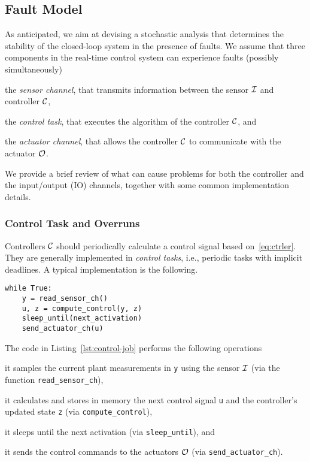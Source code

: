 \subsection{Fault Model}%
\label{sec:impl}%
%
As anticipated, we aim at devising a stochastic analysis that determines the stability of the closed-loop system in the presence of faults.
We assume that three components in the real-time control system can experience faults (possibly simultaneously)
%
\begin{enumerate*}[label=(\roman*)]
    \item the \emph{sensor channel}, that transmits information between the sensor $\mathcal{I}$ and controller $\mathcal{C}$,
    \item the \emph{control task}, that executes the algorithm of the controller $\mathcal{C}$, and 
    \item the \emph{actuator channel}, that allows the controller $\mathcal{C}$ to communicate with the actuator $\mathcal{O}$.
\end{enumerate*}
%
We provide a brief review of what can cause problems for both the controller and the input/output (IO) channels, together with some common implementation details.

\subsubsection*{Control Task and Overruns}
Controllers $\mathcal{C}$ should periodically calculate a control signal based on~\eqref{eq:ctrler}. They are generally implemented in \emph{control tasks}, i.e., periodic tasks with implicit deadlines.
A typical implementation is the following.
\begin{lstlisting}[label=lst:control-job,caption={Typical control algorithm execution.}]
while True:
    y = read_sensor_ch()
    u, z = compute_control(y, z)
    sleep_until(next_activation)
    send_actuator_ch(u)
\end{lstlisting}
The code in Listing~\ref{lst:control-job} performs the following operations
\begin{enumerate*}[label=(\roman*)]
    \item it samples the current plant measurements in \texttt{y} using the sensor $\mathcal{I}$ (via the function \texttt{read\_sensor\_ch}),
    \item it calculates and stores in memory the next control signal \texttt{u} and the controller's updated state \texttt{z} (via \texttt{compute\_control}),
    \item it sleeps until the next activation (via \texttt{sleep\_until}), and
    \item it sends the control commands to the actuators $\mathcal{O}$ (via \texttt{send\_actuator\_ch}).
\end{enumerate*}

